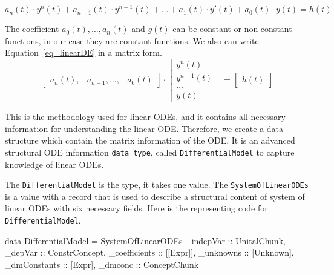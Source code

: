 \begin{equation} \label{eq_linearDE}
	a_n(t) \cdot y^n(t) + a_{n-1}(t) \cdot y^{n-1}(t) + \dots + a_1(t) \cdot y'(t) + a_0(t) \cdot y(t) = h(t)
\end{equation}

The coefficient $a_0(t), \dots, a_n(t)$ and $g(t)$ can be constant or non-constant functions, in our case they are constant functions. We also can write Equation~\ref{eq_linearDE} in a matrix form. 
\begin{equation} \label{eq_matrixnthorder}
	\begin{bmatrix}
		a_n(t), & a_{n-1}, \dots, & a_0(t)
	\end{bmatrix}
	\cdot
	\begin{bmatrix}
		y^{n}(t) \\
		y^{n-1}(t) \\
		\dots \\
		y(t)  
	\end{bmatrix}
	=
	\begin{bmatrix}
		h(t)
	\end{bmatrix}
\end{equation}

This is the methodology used for linear ODEs, and it contains all necessary information for understanding the linear ODE. Therefore, we create a data structure which contain the matrix information of the ODE. It is an advanced structural ODE information \verb|data type|, called \verb|DifferentialModel| to capture knowledge of linear ODEs.

The \verb|DifferentialModel| is the type, it takes one value. The \verb|SystemOfLinearODEs| is a value with a record that is used to describe a structural content of system of linear ODEs with six necessary fields. Here is the representing code for \verb|DifferentialModel|.
\begin{haskell1}
data DifferentialModel = SystemOfLinearODEs {
	_indepVar :: UnitalChunk,
	_depVar :: ConstrConcept,
	_coefficients :: [[Expr]],
	_unknowns :: [Unknown],
	_dmConstants :: [Expr],
	_dmconc :: ConceptChunk
}
\end{haskell1}

